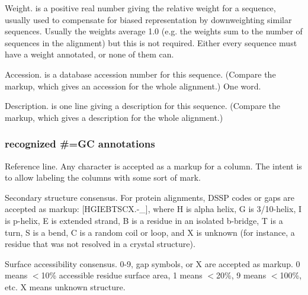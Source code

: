 \begin{sreitems}{}
\item [\emprog{WT  <f>}]
        Weight.  is a positive real number giving the
        relative weight for a sequence, usually used to compensate
        for biased representation by downweighting similar sequences.   
        Usually the weights average 1.0 (e.g. the weights sum to
        the number of sequences in the alignment) but this is not
        required. Either every sequence must have a weight annotated, 
        or none of them can.  

\item [\emprog{AC  <s>}]
        Accession.  is a database accession number for 
        this sequence. (Compare the  markup, which gives
        an accession for the whole alignment.) One word. 
        
\item [\emprog{DE  <s>}]
        Description.  is one line giving a description for
        this sequence. (Compare the  markup, which gives
        a description for the whole alignment.)
\end{sreitems}


\subsubsection{recognized \#=GC annotations}

\begin{sreitems}{}

\item [\emprog{RF}]
        Reference line. Any character is accepted as a markup for a
        column. The intent is to allow labeling the columns with some
        sort of mark.
        
\item [\emprog{SS\_cons}]
        Secondary structure consensus. For protein alignments,
        DSSP codes or gaps are accepted as markup: [HGIEBTSCX.-\_], where
        H is alpha helix, G is 3/10-helix, I is p-helix, E is extended
        strand, B is a residue in an isolated b-bridge, T is a turn, 
        S is a bend, C is a random coil or loop, and X is unknown
        (for instance, a residue that was not resolved in a crystal
        structure). 

\item [\emprog{SA\_cons}]
        Surface accessibility consensus. 0-9, gap symbols, or X are
        accepted as markup. 0 means $<$10\% accessible residue surface
        area, 1 means $<$20\%, 9 means $<$100\%, etc. X means unknown
        structure.
\end{sreitems}

